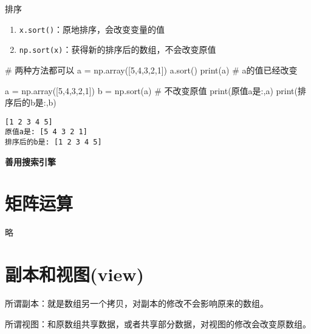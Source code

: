 \documentclass[
  letterpaper,
  DIV=11,
  numbers=noendperiod]{scrreprt}
\newenvironment{Shaded}{\begin{snugshade}}{\end{snugshade}}
\newcommand{\BuiltInTok}[1]{\textcolor[rgb]{0.00,0.23,0.31}{#1}}
\newcommand{\CommentTok}[1]{\textcolor[rgb]{0.37,0.37,0.37}{#1}}
\newcommand{\DecValTok}[1]{\textcolor[rgb]{0.68,0.00,0.00}{#1}}
\newcommand{\NormalTok}[1]{\textcolor[rgb]{0.00,0.23,0.31}{#1}}
\newcommand{\OperatorTok}[1]{\textcolor[rgb]{0.37,0.37,0.37}{#1}}
\newcommand{\StringTok}[1]{\textcolor[rgb]{0.13,0.47,0.30}{#1}}
\providecommand{\tightlist}{%
  \setlength{\itemsep}{0pt}\setlength{\parskip}{0pt}}\usepackage{longtable,booktabs,array}
\begin{document}
排序

\begin{enumerate}
\def\labelenumi{\arabic{enumi}.}
\tightlist
\item
  \texttt{x.sort()}：原地排序，会改变变量的值
\item
  \texttt{np.sort(x)}：获得新的排序后的数组，不会改变原值
\end{enumerate}

\begin{Shaded}
\begin{Highlighting}[]
\CommentTok{\# 两种方法都可以}
\NormalTok{a }\OperatorTok{=}\NormalTok{ np.array([}\DecValTok{5}\NormalTok{,}\DecValTok{4}\NormalTok{,}\DecValTok{3}\NormalTok{,}\DecValTok{2}\NormalTok{,}\DecValTok{1}\NormalTok{])}
\NormalTok{a.sort() }
\BuiltInTok{print}\NormalTok{(a) }\CommentTok{\# a的值已经改变}


\NormalTok{a }\OperatorTok{=}\NormalTok{ np.array([}\DecValTok{5}\NormalTok{,}\DecValTok{4}\NormalTok{,}\DecValTok{3}\NormalTok{,}\DecValTok{2}\NormalTok{,}\DecValTok{1}\NormalTok{])}
\NormalTok{b }\OperatorTok{=}\NormalTok{ np.sort(a) }\CommentTok{\# 不改变原值}
\BuiltInTok{print}\NormalTok{(}\StringTok{\textquotesingle{}原值a是:\textquotesingle{}}\NormalTok{,a)}
\BuiltInTok{print}\NormalTok{(}\StringTok{\textquotesingle{}排序后的b是:\textquotesingle{}}\NormalTok{,b)}
\end{Highlighting}
\end{Shaded}

\begin{verbatim}
[1 2 3 4 5]
原值a是: [5 4 3 2 1]
排序后的b是: [1 2 3 4 5]
\end{verbatim}

\textbf{善用搜索引擎}

\hypertarget{ux77e9ux9635ux8fd0ux7b97}{%
\section{矩阵运算}\label{ux77e9ux9635ux8fd0ux7b97}}

略

\hypertarget{ux526fux672cux548cux89c6ux56feview}{%
\section{副本和视图(view)}\label{ux526fux672cux548cux89c6ux56feview}}

所谓副本：就是数组另一个拷贝，对副本的修改不会影响原来的数组。

所谓视图：和原数组共享数据，或者共享部分数据，对视图的修改会改变原数组。
\end{document}
